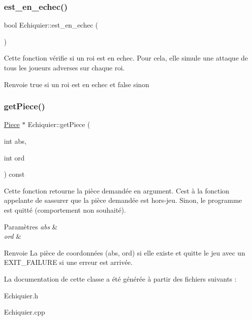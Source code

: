 \subsubsection{\texorpdfstring{est\+\_\+en\+\_\+echec()}{est\_en\_echec()}}
{\footnotesize\ttfamily bool Echiquier\+::est\+\_\+en\+\_\+echec (\begin{DoxyParamCaption}{ }\end{DoxyParamCaption})}



Cette fonction vérifie si un roi est en echec. Pour cela, elle simule une attaque de tous les joueurs adverses sur chaque roi. 

\begin{DoxyReturn}{Renvoie}
true si un roi est en echec et false sinon 
\end{DoxyReturn}
\mbox{\label{classEchiquier_a1d265e55a73ab57f3a208bac01c59ebd}} 
\subsubsection{\texorpdfstring{get\+Piece()}{getPiece()}}
{\footnotesize\ttfamily \hyperlink{classPiece}{Piece} $\ast$ Echiquier\+::get\+Piece (\begin{DoxyParamCaption}\item[{int}]{abs,  }\item[{int}]{ord }\end{DoxyParamCaption}) const}



Cette fonction retourne la pièce demandée en argument. C\textquotesingle{}est à la fonction appelante de s\textquotesingle{}assurer que la pièce demandée est hors-\/jeu. Sinon, le programme est quitté (comportement non souhaité). 


\begin{DoxyParams}{Paramètres}
{\em abs} & \\
\hline
{\em ord} & \\
\hline
\end{DoxyParams}
\begin{DoxyReturn}{Renvoie}
La pièce de coordonnées (abs, ord) si elle existe et quitte le jeu avec un E\+X\+I\+T\+\_\+\+F\+A\+I\+L\+U\+RE si une erreur est arrivée. 
\end{DoxyReturn}


La documentation de cette classe a été générée à partir des fichiers suivants \+:\begin{DoxyCompactItemize}
\item 
Echiquier.\+h\item 
Echiquier.\+cpp\end{DoxyCompactItemize}
